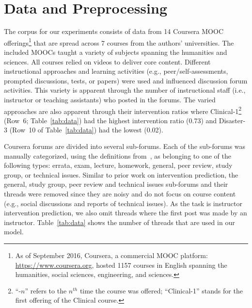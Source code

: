 \documentclass[letterpaper]{article}
\begin{document}
\section{Data and Preprocessing}
\label{sect:data}

The corpus for our experiments consists of data from 14 Coursera MOOC
offerings\footnote{As of September 2016, Coursera, a commercial MOOC
  platform: \url{https://www.coursera.org}, hosted 1157 courses in
  English spanning the humanities, social sciences, engineering, and
  sciences.} that are spread across 7 courses from the authors'
universities. The included MOOCs taught a variety of subjects spanning
the humanities and sciences. All courses relied on videos to deliver
core content. Different instructional approaches and learning
activities (e.g., peer/self-assessments, prompted discussions, tests,
or papers) were used and influenced discussion forum activities. This
variety is apparent through the number of instructional staff (i.e.,
instructor or teaching assistants) who posted in the forums.  The
varied approaches are also apparent through their intervention ratios
where {\sc Clinical-1}\footnote{``-$n$'' refers to the $n^{th}$ time
  the course was offered; ``{\sc Clinical-1}'' stands for the first
  offering of the Clinical course.} (Row~6; Table~\ref{tab:data}) had
the highest intervention ratio (0.73) and {\sc Disaster-3} (Row~10 of
Table~\ref{tab:data}) had the lowest (0.02).

Coursera forums are divided into several sub-forums. Each of the sub-forums was 
manually categorized, using the definitions  
from~\cite{chandrasekaran2015learning}, as belonging to one of the following 
types: errata, exam, lecture, homework, general, peer review, study group, or 
technical issues. Similar to prior work on intervention prediction, the general, 
study group, peer review  and technical issues sub-forums and their threads were 
removed since they are noisy and do not focus on course content 
(e.g., social discussions and reports of technical issues). As the task is 
instructor intervention prediction, we also omit threads where the first post 
was made by an instructor. Table~\ref{tab:data} shows the number of threads 
that are used in our model.
\end{document}
